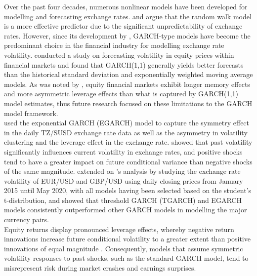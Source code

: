 \documentclass[oneside,12pt]{CUEDthesisPSnPDF}
\newcommand{\textcite}{\citet}
\newcommand{\parencite}{\citep}
\begin{document}
Over the past four decades, numerous nonlinear models have been developed for modelling and forecasting exchange rates. \textcite{chang1999methodical} and \textcite{gencay1999linear} argue that the random walk model is a more effective predictor due to the significant unpredictability of exchange rates. However, since its development by \textcite{bollerslev1986generalised}, GARCH-type models have become the predominant choice in the financial industry for modelling exchange rate volatility. \textcite{ederington2005forecasting} conducted a study on forecasting volatility in equity prices within financial markets and found that GARCH(1,1) generally yields better forecasts than the historical standard deviation and exponentially weighted moving average models. As was noted by \textcite{ederington2005forecasting}, equity financial markets exhibit longer memory effects and more asymmetric leverage effects than what is captured by GARCH(1,1) model estimates, thus future research focused on these limitations to the GARCH model framework.\\

\textcite{epaphra2016modeling} used the exponential GARCH (EGARCH) model to capture the symmetry effect in the daily TZ/SUSD exchange rate data as well as the asymmetry in volatility clustering and the leverage effect in the exchange rate. \textcite{epaphra2016modeling} showed that past volatility significantly influences current volatility in exchange rates, and positive shocks tend to have a greater impact on future conditional variance than negative shocks of the same magnitude. \textcite{abdullah2020using} extended on \textcite{epaphra2016modeling}'s analysis by studying the exchange rate volatility of EUR/USD and GBP/USD using daily closing prices from January 2015 until May 2020, with all models having been selected based on the student's t-distribution, and showed that threshold GARCH (TGARCH) and EGARCH models consistently outperformed other GARCH models in modelling the major currency pairs. \\

Equity returns display pronounced leverage effects, whereby negative return innovations increase future conditional volatility to a greater extent than positive innovations of equal magnitude \parencite{black1976studies,christie1982stochastic,cont2001empirical}. Consequently, models that assume symmetric volatility responses to past shocks, such as the standard GARCH model, tend to misrepresent risk during market crashes and earnings surprises. \\
\end{document}
